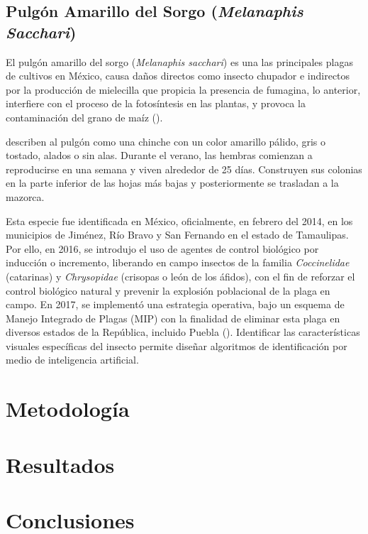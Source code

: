 \documentclass[11pt]{exam}
\begin{document}
        \subsection{Pulg\'on Amarillo del Sorgo (\textit{Melanaphis Sacchari})}\label{sec2.4}
        El pulg\'on amarillo del sorgo (\textit{Melanaphis sacchari}) es una las principales plagas de cultivos en M\'exico, causa daños directos como insecto chupador e indirectos por la producci\'on de mielecilla que propicia la presencia de fumagina, lo anterior, interfiere con el proceso de la fotos\'intesis en las plantas, y provoca la contaminaci\'on del grano de ma\'iz (\cite{pecina-2021}). 

        \cite{hakeem-2019} describen al pulg\'on como una chinche con un color amarillo p\'alido, gris o tostado, alados o sin alas. Durante el verano, las hembras comienzan a reproducirse en una semana y viven alrededor de 25 d\'ias. Construyen sus colonias en la parte inferior de las hojas más bajas y posteriormente se trasladan a la mazorca. 

        Esta especie fue identificada en M\'exico, oficialmente, en febrero del 2014, en los municipios de Jim\'enez, R\'io Bravo y San Fernando en el estado de Tamaulipas. Por ello, en 2016, se introdujo el uso de agentes de control biol\'ogico por inducci\'on o incremento, liberando en campo insectos de la familia \textit{Coccinelidae} (catarinas) y \textit{Chrysopidae} (crisopas o le\'on de los \'afidos), con el fin de reforzar el control biol\'ogico natural y prevenir la explosi\'on poblacional de la plaga en campo. En 2017, se implement\'o una estrategia operativa, bajo un esquema de Manejo Integrado de Plagas (MIP) con la finalidad de eliminar esta plaga en diversos estados de la República, incluido Puebla (\cite{senasica-2018}). Identificar las características visuales específicas del insecto permite diseñar algoritmos de identificación por medio de inteligencia artificial.
        
    \section{Metodolog\'ia}\label{sec3}

    \section{Resultados}\label{sec4}

    \section{Conclusiones}\label{sec5}

    \printbibliography
\end{document}
